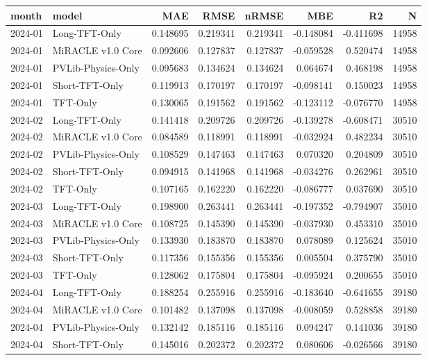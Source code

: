 \begin{tabular}{llrrrrrr}
\toprule
month & model & MAE & RMSE & nRMSE & MBE & R2 & N \\
\midrule
2024-01 & Long-TFT-Only & 0.148695 & 0.219341 & 0.219341 & -0.148084 & -0.411698 & 14958 \\
2024-01 & MiRACLE v1.0 Core & 0.092606 & 0.127837 & 0.127837 & -0.059528 & 0.520474 & 14958 \\
2024-01 & PVLib-Physics-Only & 0.095683 & 0.134624 & 0.134624 & 0.064674 & 0.468198 & 14958 \\
2024-01 & Short-TFT-Only & 0.119913 & 0.170197 & 0.170197 & -0.098141 & 0.150023 & 14958 \\
2024-01 & TFT-Only & 0.130065 & 0.191562 & 0.191562 & -0.123112 & -0.076770 & 14958 \\
2024-02 & Long-TFT-Only & 0.141418 & 0.209726 & 0.209726 & -0.139278 & -0.608471 & 30510 \\
2024-02 & MiRACLE v1.0 Core & 0.084589 & 0.118991 & 0.118991 & -0.032924 & 0.482234 & 30510 \\
2024-02 & PVLib-Physics-Only & 0.108529 & 0.147463 & 0.147463 & 0.070320 & 0.204809 & 30510 \\
2024-02 & Short-TFT-Only & 0.094915 & 0.141968 & 0.141968 & -0.034276 & 0.262961 & 30510 \\
2024-02 & TFT-Only & 0.107165 & 0.162220 & 0.162220 & -0.086777 & 0.037690 & 30510 \\
2024-03 & Long-TFT-Only & 0.198900 & 0.263441 & 0.263441 & -0.197352 & -0.794907 & 35010 \\
2024-03 & MiRACLE v1.0 Core & 0.108725 & 0.145390 & 0.145390 & -0.037930 & 0.453310 & 35010 \\
2024-03 & PVLib-Physics-Only & 0.133930 & 0.183870 & 0.183870 & 0.078089 & 0.125624 & 35010 \\
2024-03 & Short-TFT-Only & 0.117356 & 0.155356 & 0.155356 & 0.005504 & 0.375790 & 35010 \\
2024-03 & TFT-Only & 0.128062 & 0.175804 & 0.175804 & -0.095924 & 0.200655 & 35010 \\
2024-04 & Long-TFT-Only & 0.188254 & 0.255916 & 0.255916 & -0.183640 & -0.641655 & 39180 \\
2024-04 & MiRACLE v1.0 Core & 0.101482 & 0.137098 & 0.137098 & -0.008059 & 0.528858 & 39180 \\
2024-04 & PVLib-Physics-Only & 0.132142 & 0.185116 & 0.185116 & 0.094247 & 0.141036 & 39180 \\
2024-04 & Short-TFT-Only & 0.145016 & 0.202372 & 0.202372 & 0.080606 & -0.026566 & 39180 \\

\end{tabular}
